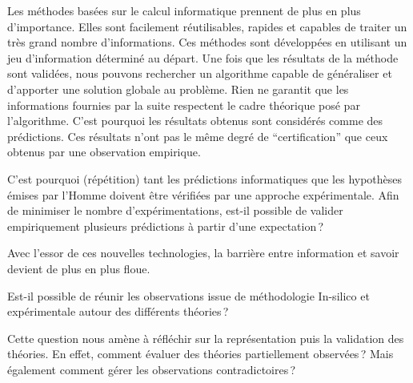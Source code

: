 \begin{refsegment}

Les méthodes basées sur le calcul informatique prennent de plus en plus d’importance. Elles sont facilement réutilisables, rapides et capables de traiter un très grand nombre d’informations. Ces méthodes sont développées en utilisant un jeu d’information déterminé au départ. Une fois que les résultats de la méthode sont validées, nous pouvons rechercher un algorithme capable de généraliser et d’apporter une solution globale au problème. Rien ne garantit que les informations fournies par la suite respectent le cadre théorique posé par l’algorithme. C’est pourquoi les résultats obtenus sont considérés comme des prédictions. Ces résultats n’ont pas le même degré de “certification” que ceux obtenus par une observation empirique.

C’est pourquoi (répétition) tant les prédictions informatiques que les hypothèses émises par l’Homme doivent être vérifiées par une approche expérimentale. Afin de minimiser le nombre d’expérimentations, est-il possible de valider empiriquement plusieurs prédictions à partir d’une expectation ?

Avec l'essor de ces nouvelles technologies, la barrière entre information et savoir devient de plus en plus floue.


Est-il possible de réunir les observations issue de méthodologie In-silico et expérimentale autour des différents théories ?

Cette question nous amène à réfléchir sur la représentation puis la validation des théories. En effet, comment évaluer des théories partiellement observées ? Mais également comment gérer les observations contradictoires ?


\end{refsegment}
